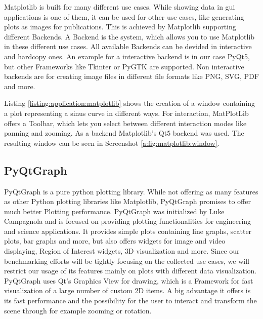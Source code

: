 Matplotlib is built for many different use cases. While showing data in
\gls{gui} applications is one of them, it can be used for other use cases, like
generating plots as images for publications. This is achieved by Matplotlib
supporting different Backends. A Backend is the system, which allows you to use
Matplotlib in these different use cases. All available Backends can be devided
in interactive and hardcopy ones. An example for a interactive backend is in our
case PyQt5, but other Frameworks like Tkinter or PyGTK are supported. Non
interactive backends are for creating image files in different file formats like
PNG, SVG, PDF and more.  \cite{MatplotlibIntro, PythonDataVis}

Listing \ref{listing:application:matplotlib} shows the creation of a window
containing a plot representing a sinus curve in different ways. For interaction,
MatPlotLib offers a Toolbar, which lets you select between different interaction
modes like panning and zooming. As a backend Matplotlib's Qt5 backend was used.
The resulting window can be seen in Screenshot \ref{a:fig:matplotlib:window}.



\subsection{PyQtGraph} \label{sec:application:libraries:pyqtgraph}

PyQtGraph is a pure python plotting library. While not offering as many features
as other Python plotting libraries like Matplotlib, PyQtGraph promises to offer
much better Plotting performance. PyQtGraph was initialized by Luke Campagnola
and is focused on providing plotting functionalities for engineering and science
applications. It provides simple plots containing line graphs, scatter plots,
bar graphs and more, but also offers widgets for image and video displaying,
Region of Interest widgets, 3D visualization and more. Since our benchmarking
efforts will be tightly focusing on the collected use cases, we will restrict
our usage of its features mainly on plots with different data visualization.
PyQtGraph uses Qt's Graphics View for drawing, which is a Framework for fast
visualization of a large number of custom 2D items. A big advantage it offers is
its fast performance and the possibility for the user to interact and transform
the scene through for example zooming or rotation. \cite{GraphicsView}

